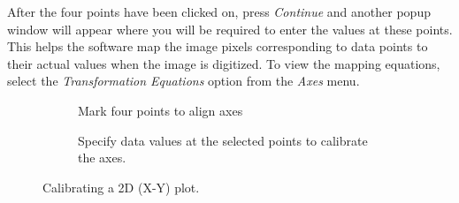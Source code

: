 \documentclass[letterpaper, 11pt]{article}
\begin{document}
After the four points have been clicked on, press \emph{Continue} and another popup window will appear where you will be required to enter the values at these points. This helps the software map the image pixels corresponding to data points to their actual values when the image is digitized. To view the mapping equations, select the \emph{Transformation Equations} option from the \emph{Axes} menu.

\begin{figure}
\centering
{\begin{subfigure}[b]{0.4\textwidth}
\caption{Mark four points to align axes}
\end{subfigure}
\hspace{5mm}
\begin{subfigure}[b]{0.45\textwidth}
\caption{Specify data values at the selected points to calibrate the axes.}
\end{subfigure}}
\caption{Calibrating a 2D (X-Y) plot.}
\label{fig:xyAlignment}
\end{figure}
\end{document}
